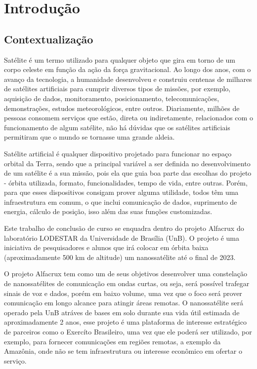 \chapter{Introdução} \label{introducao}
\section{Contextualização}
Satélite é um termo utilizado para qualquer objeto que gira em torno de um corpo celeste em função da ação da força gravitacional. Ao longo dos anos, com o avanço da tecnologia, a humanidade desenvolveu e construiu centenas de milhares de satélites artificiais para cumprir diversos tipos de missões, por exemplo, aquisição de dados, monitoramento, posicionamento, telecomunicações, demonstrações, estudos meteorológicos, entre outros. Diariamente, milhões de pessoas consomem serviços que estão, direta ou indiretamente, relacionados com o funcionamento de algum satélite, não há dúvidas que os satélites artificiais permitiram que o mundo se tornasse uma grande aldeia.

Satélite artificial é qualquer dispositivo projetado para funcionar no espaço orbital da Terra, sendo que a principal variável a ser definida no desenvolvimento de um satélite é a sua missão, pois ela que guia boa parte das escolhas do projeto - órbita utilizada, formato, funcionalidades, tempo de vida, entre outras. Porém, para que esses dispositivos consigam prover alguma utilidade, todos têm uma infraestrutura em comum, o que inclui comunicação de dados, suprimento de energia, cálculo de posição, isso além das suas funções customizadas.\cite{nasa_comms_article} 

Este trabalho de conclusão de curso se enquadra dentro do projeto Alfacrux do laboratório LODESTAR da Universidade de Brasília (UnB). O projeto é uma iniciativa de pesquisadores e alunos que irá colocar em órbita baixa (aproximadamente 500 km de altitude) um nanossatélite até o final de 2023.

O projeto Alfacrux tem como um de seus objetivos desenvolver uma constelação de nanossatélites de comunicação em ondas curtas, ou seja, será possível trafegar sinais de voz e dados, porém em baixo volume, uma vez que o foco será prover comunicação em longo alcance para atingir áreas remotas. O nanossatélite será operado pela UnB atráves de bases em solo durante sua vida útil estimada de aproximadamente 2 anos, esse projeto é uma plataforma de interesse estratégico de parceiros como o Exercíto Brasileiro, uma vez que ele poderá ser utilizado, por exemplo, para fornecer comunicações em regiões remotas, a exemplo da Amazônia, onde não se tem infraestrutura ou interesse econômico em ofertar o serviço. 

